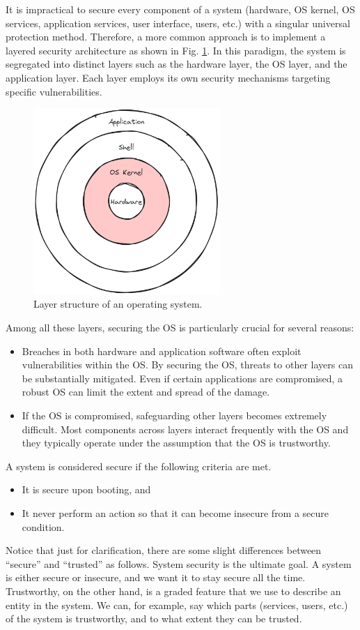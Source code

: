 It is impractical to secure every component of a system (hardware, OS kernel, OS services, application services, user interface, users, etc.) with a singular universal protection method. Therefore, a more common approach is to implement a layered security architecture as shown in Fig. \ref{ch:ossec:fig:layerstructure}. In this paradigm, the system is segregated into distinct layers such as the hardware layer, the OS layer, and the application layer. Each layer employs its own security mechanisms targeting specific vulnerabilities.
\begin{figure}[htbp]
	\centering
	\includegraphics[width=200pt]{chapters/part-4/figures/os_layer.png}
	\caption{Layer structure of an operating system.} \label{ch:ossec:fig:layerstructure}
\end{figure}

Among all these layers, securing the OS is particularly crucial for several reasons:
\begin{itemize}
	\item Breaches in both hardware and application software often exploit vulnerabilities within the OS. By securing the OS, threats to other layers can be substantially mitigated. Even if certain applications are compromised, a robust OS can limit the extent and spread of the damage.
	\item If the OS is compromised, safeguarding other layers becomes extremely difficult. Most components across layers interact frequently with the OS and they typically operate under the assumption that the OS is trustworthy.
\end{itemize}

A system is considered secure if the following criteria are met.
\begin{itemize}
	\item It is secure upon booting, and
	\item It never perform an action so that it can become insecure from a secure condition.
\end{itemize}
Notice that just for clarification, there are some slight differences between ``secure'' and ``trusted'' as follows. System security is the ultimate goal. A system is either secure or insecure, and we want it to stay secure all the time. Trustworthy, on the other hand, is a graded feature that we use to describe an entity in the system. We can, for example, say which parts (services, users, etc.) of the system is trustworthy, and to what extent they can be trusted.

